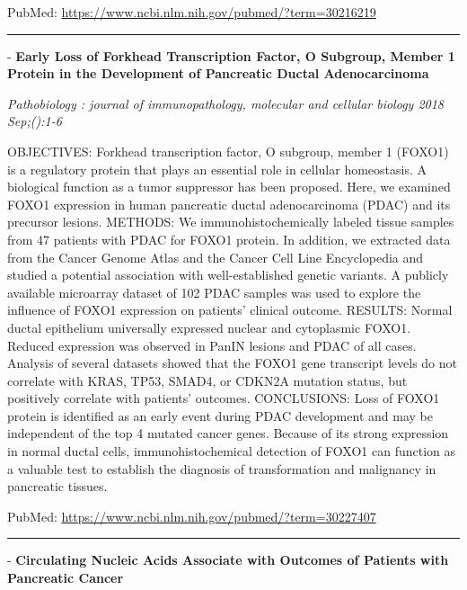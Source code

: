 \documentclass[]{article}
\begin{document}
PubMed: \url{https://www.ncbi.nlm.nih.gov/pubmed/?term=30216219}

{}

{}

\begin{center}\rule{0.5\linewidth}{\linethickness}\end{center}

 - \textbf{Early Loss of Forkhead Transcription Factor, O Subgroup,
Member 1 Protein in the Development of Pancreatic Ductal Adenocarcinoma}

\emph{Pathobiology : journal of immunopathology, molecular and cellular
biology 2018 Sep;():1-6}

OBJECTIVES: Forkhead transcription factor, O subgroup, member 1 (FOXO1)
is a regulatory protein that plays an essential role in cellular
homeostasis. A biological function as a tumor suppressor has been
proposed. Here, we examined FOXO1 expression in human pancreatic ductal
adenocarcinoma (PDAC) and its precursor lesions. METHODS: We
immunohistochemically labeled tissue samples from 47 patients with PDAC
for FOXO1 protein. In addition, we extracted data from the Cancer Genome
Atlas and the Cancer Cell Line Encyclopedia and studied a potential
association with well-established genetic variants. A publicly available
microarray dataset of 102 PDAC samples was used to explore the influence
of FOXO1 expression on patients' clinical outcome. RESULTS: Normal
ductal epithelium universally expressed nuclear and cytoplasmic FOXO1.
Reduced expression was observed in PanIN lesions and PDAC of all cases.
Analysis of several datasets showed that the FOXO1 gene transcript
levels do not correlate with KRAS, TP53, SMAD4, or CDKN2A mutation
status, but positively correlate with patients' outcomes. CONCLUSIONS:
Loss of FOXO1 protein is identified as an early event during PDAC
development and may be independent of the top 4 mutated cancer genes.
Because of its strong expression in normal ductal cells,
immunohistochemical detection of FOXO1 can function as a valuable test
to establish the diagnosis of transformation and malignancy in
pancreatic tissues.

PubMed: \url{https://www.ncbi.nlm.nih.gov/pubmed/?term=30227407}

{}

{}

\begin{center}\rule{0.5\linewidth}{\linethickness}\end{center}

 - \textbf{Circulating Nucleic Acids Associate with Outcomes of Patients
with Pancreatic Cancer}
\end{document}
